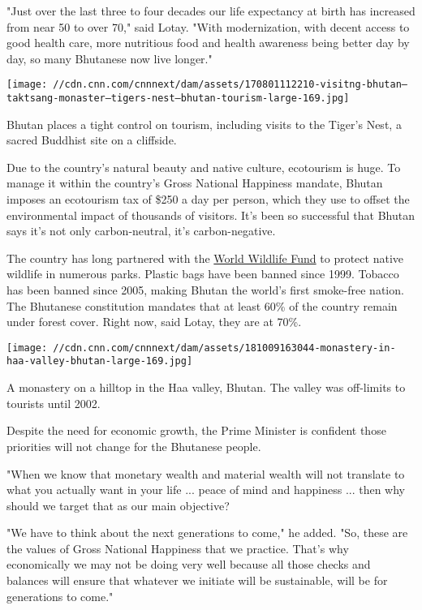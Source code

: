 "Just over the last three to four decades our life expectancy at birth
has increased from near 50 to over 70," said Lotay. "With modernization,
with decent access to good health care, more nutritious food and health
awareness being better day by day, so many Bhutanese now live longer."

\texttt{[image: //cdn.cnn.com/cnnnext/dam/assets/170801112210-visitng-bhutan---taktsang-monaster--tigers-nest---bhutan-tourism-large-169.jpg]}

Bhutan places a tight control on tourism, including visits to the
Tiger's Nest, a sacred Buddhist site on a cliffside.

Due to the country's natural beauty and native culture, ecotourism is
huge. To manage it within the country's Gross National Happiness
mandate, Bhutan imposes an ecotourism tax of \$250 a day per person,
which they use to offset the environmental impact of thousands of
visitors. It's been so successful that Bhutan says it's not only
carbon-neutral, it's carbon-negative.

The country has long partnered with the
\href{https://www.worldwildlife.org/press-releases/bhutan-wwf-and-partners-announce-deal-to-permanently-secure-bhutan-s-extensive-network-of-protected-areas}{World
Wildlife Fund} to protect native wildlife in numerous parks. Plastic
bags have been banned since 1999. Tobacco has been banned since 2005,
making Bhutan the world's first smoke-free nation. The Bhutanese
constitution mandates that at least 60\% of the country remain under
forest cover. Right now, said Lotay, they are at 70\%.

\texttt{[image: //cdn.cnn.com/cnnnext/dam/assets/181009163044-monastery-in-haa-valley-bhutan-large-169.jpg]}

A monastery on a hilltop in the Haa valley, Bhutan. The valley was
off-limits to tourists until 2002.

Despite the need for economic growth, the Prime Minister is confident
those priorities will not change for the Bhutanese people.

"When we know that monetary wealth and material wealth will not
translate to what you actually want in your life ... peace of mind and
happiness ... then why should we target that as our main objective?

"We have to think about the next generations to come," he added. "So,
these are the values of Gross National Happiness that we practice.
That's why economically we may not be doing very well because all those
checks and balances will ensure that whatever we initiate will be
sustainable, will be for generations to come."

